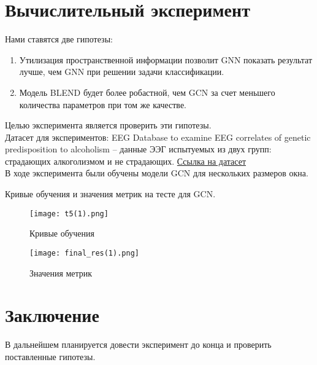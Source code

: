 \documentclass{article}
\begin{document}
\section{Вычислительный эксперимент}
Нами ставятся две гипотезы:
\begin{enumerate}
    \item Утилизация пространственной информации позволит GNN показать результат лучше, чем GNN при решении задачи классификации.
    \item Модель BLEND будет более робастной, чем GCN за счет меньшего количества параметров при том же качестве.
\end{enumerate}
Целью эксперимента является проверить эти гипотезы. \\
Датасет для экспериментов: EEG Database to examine EEG correlates of genetic
predisposition to alcoholism -- данные ЭЭГ испытуемых из двух групп: страдающих алкоголизмом и не страдающих. \href{https://archive.ics.uci.edu/dataset/121/eeg+database}{Ссылка на датасет}
\\
В ходе эксперимента были обучены модели GCN для нескольких размеров окна.
\newpage
\begin{flushleft}
Кривые обучения и значения метрик на тесте для GCN.
\end{flushleft}
\begin{figure}[!h]
\begin{minipage}{.475\textwidth} 
    \texttt{[image: t5(1).png]}
 	\caption{Кривые обучения}
\end{minipage}
\begin{minipage}{.475\textwidth}
    \texttt{[image: final\_res(1).png]}
 	\caption{Значения метрик}
\end{minipage}
\end{figure}

\section{Заключение}
В дальнейшем планируется довести эксперимент до конца и проверить поставленные гипотезы.


\end{document}

